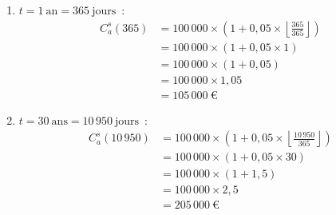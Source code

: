 \documentclass{article}
\begin{document}
\begin{enumerate}[label=\textbf{R1.\arabic*}]
\begin{enumerate}[label=(\alph*)]
              \item $t = 1\ \text{an} = 365\ \text{jours}$~: 
                    \begin{align*}
                        C_a^s(365) & = 100\,000 \times \left(1 + 0,05 \times \left\lfloor \frac{365}{365} \right\rfloor \right) \\
                                   & = 100\,000 \times \left(1 + 0,05 \times 1 \right)                                          \\
                                   & = 100\,000 \times \left(1 + 0,05 \right)                                                   \\
                                   & = 100\,000 \times 1,05                                                                     \\
                                   & = \boxed{105\,000\ \text{€}}                                                             
                    \end{align*}
                            
              \item $t = 30\ \text{ans} = 10\,950\ \text{jours}$~: 
                    \begin{align*}
                        C_a^s(10\,950) & = 100\,000 \times \left(1 + 0,05 \times \left\lfloor \frac{10\,950}{365} \right\rfloor \right) \\
                                       & = 100\,000 \times \left(1 + 0,05 \times 30 \right)                                             \\
                                       & = 100\,000 \times \left(1 + 1,5 \right)                                                        \\
                                       & = 100\,000 \times 2,5                                                                          \\
                                       & = \boxed{205\,000\ \text{€}}                                                                 
                    \end{align*}
          \end{enumerate}
          

\end{enumerate}
\end{document}
